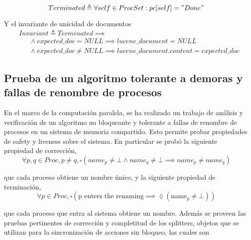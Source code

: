 \documentclass[runningheads]{llncs}
\begin{document}
\begin{equation}
    Terminated \triangleq \forall self \in ProcSet: pc[self] = "Done"
\end{equation}

Y el invariante de unicidad de documentos
\[
\begin{aligned}
    &Invariant \triangleq Terminated \implies \\
    &\phantom{Inv} \land expected\_doc = NULL \implies lucene\_document = NULL \\ 
    &\phantom{Inv} \land expected\_doc \neq NULL \implies lucene\_document.content = expected\_doc
\end{aligned}
\]


\subsection{Prueba de un algoritmo tolerante a demoras y fallas de renombre de procesos}
En el marco de la computación paralela, se ha realizado un trabajo \cite{case_study} de análisis y verificación de un algoritmo no bloqueante y tolerante a fallas de renombre de procesos en un sistema de memoria compartido. Esto permite probar propiedades de safety y liveness sobre el sistema. En particular se probó la siguiente propiedad de corrección, 
\begin{equation}
    \forall p, q \in Proc, p \neq q, \square(name_p \neq \bot \land name_q \neq \bot \implies name_p \neq name_q)
\end{equation}

que cada proceso obtiene un nombre único, y la siguiente propiedad de terminación,
\begin{equation}
    \forall p \in Proc, \square(\text{p enters the renaming} \implies \lozenge (\text{name}_p \neq \bot))
\end{equation}

que cada proceso que entra al sistema obtiene un nombre.
Además se proveen las pruebas pertinentes de corrección y completitud de los splitters, objetos que se utilizan para la sincronización de acciones sin bloqueo,  las cuales son
\end{document}
